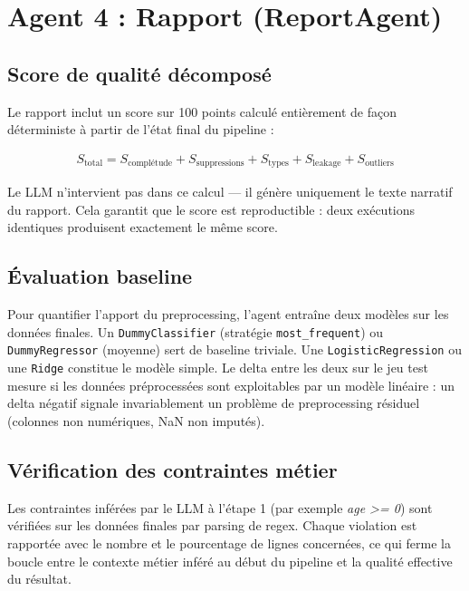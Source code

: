 \documentclass[12pt,a4paper]{article}
\begin{document}
\section{Agent 4 : Rapport (ReportAgent)}

\subsection{Score de qualité décomposé}

Le rapport inclut un score sur 100 points calculé entièrement de façon déterministe à
partir de l'état final du pipeline :

\begin{align}
S_{\text{total}} = S_{\text{complétude}} + S_{\text{suppressions}} + S_{\text{types}}
  + S_{\text{leakage}} + S_{\text{outliers}}
\end{align}

Le LLM n'intervient pas dans ce calcul --- il génère uniquement le texte narratif du
rapport. Cela garantit que le score est reproductible : deux exécutions identiques
produisent exactement le même score.

\subsection{Évaluation baseline}

Pour quantifier l'apport du preprocessing, l'agent entraîne deux modèles sur les données
finales. Un \texttt{DummyClassifier} (stratégie \texttt{most\_frequent}) ou
\texttt{DummyRegressor} (moyenne) sert de baseline triviale. Une \texttt{LogisticRegression}
ou une \texttt{Ridge} constitue le modèle simple. Le delta entre les deux sur le jeu
test mesure si les données préprocessées sont exploitables par un modèle linéaire : un
delta négatif signale invariablement un problème de preprocessing résiduel (colonnes
non numériques, NaN non imputés).

\subsection{Vérification des contraintes métier}

Les contraintes inférées par le LLM à l'étape 1 (par exemple \textit{age >= 0}) sont
vérifiées sur les données finales par parsing de regex. Chaque violation est rapportée
avec le nombre et le pourcentage de lignes concernées, ce qui ferme la boucle entre
le contexte métier inféré au début du pipeline et la qualité effective du résultat.
\end{document}
